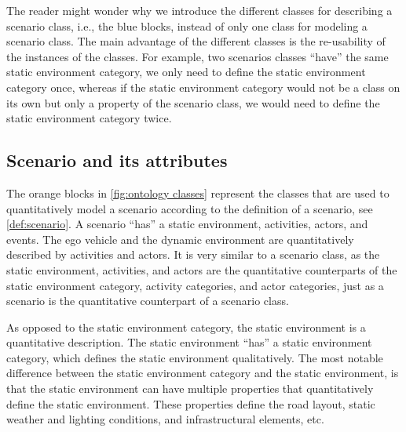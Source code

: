 \cbstart
The reader might wonder why we introduce the different classes for describing a scenario class, i.e., the blue blocks, instead of only one class for modeling a scenario class. 
The main advantage of the different classes is the re-usability of the instances of the classes. For example, two scenarios classes ``have'' the same static environment category, we only need to define the static environment category once, whereas if the static environment category would not be a class on its own but only a property of the scenario class, we would need to define the static environment category twice.
\cbend


\subsection{Scenario and its attributes}
\label{sec:domain scenario}

The orange blocks in \cref{fig:ontology classes} represent the classes that are used to quantitatively model a scenario according to the definition of a scenario, see \cref{def:scenario}. A scenario ``has'' a static environment, activities, actors, and events. 
\cbstartb
The ego vehicle and the dynamic environment are quantitatively described by activities and actors. 
\cbend
It is very similar to a scenario class, as the static environment, activities, and actors are the quantitative counterparts of the static environment category, activity categories, and actor categories, just as a scenario is the quantitative counterpart of a scenario class. 

\cbstartc
As opposed to the static environment category, the static environment is a quantitative description.
\cbend
The static environment ``has'' a static environment category, which defines the static environment qualitatively. The most notable difference between the static environment category and the static environment, is that the static environment can have multiple properties that quantitatively define the static environment. These properties define the road layout, static weather and lighting conditions, and infrastructural elements, etc.

